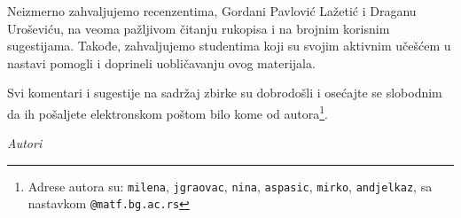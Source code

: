 
Neizmerno zahvaljujemo recenzentima, Gordani Pavlović Lažetić i Draganu Uroševiću, na veoma pažljivom čitanju rukopisa i na brojnim korisnim sugestijama. Takođe, zahvaljujemo studentima koji su svojim aktivnim učešćem u nastavi pomogli i doprineli uobličavanju ovog materijala. 

Svi komentari i sugestije na sadržaj zbirke su dobrodošli i osećajte se slobodnim da ih pošaljete elektronskom poštom bilo kome od autora\footnote{Adrese autora su: \texttt{milena}, \texttt{jgraovac}, \texttt{nina}, \texttt{aspasic}, \texttt{mirko}, \texttt{andjelkaz}, sa nastavkom \texttt{@matf.bg.ac.rs}}. 



\bigskip

\begin{flushright}
{\em Autori}
\end{flushright}